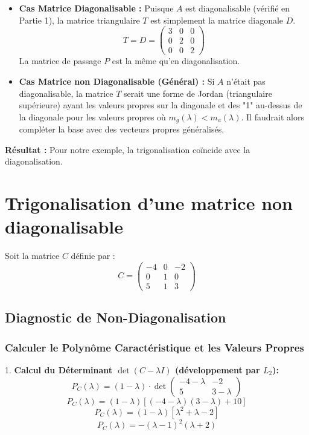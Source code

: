 \documentclass[french]{yLectureNote}
\begin{document}
\begin{itemize}
    \item \textbf{Cas Matrice Diagonalisable :}
    Puisque $A$ est diagonalisable (vérifié en Partie 1), la matrice triangulaire $T$ est simplement la matrice diagonale $D$.
    $$T = D = \begin{pmatrix} 3 & 0 & 0 \\ 0 & 2 & 0 \\ 0 & 0 & 2 \end{pmatrix}$$
    La matrice de passage $P$ est la même qu'en diagonalisation.

    \item \textbf{Cas Matrice non Diagonalisable (Général) :}
    Si $A$ n'était pas diagonalisable, la matrice $T$ serait une forme de Jordan (triangulaire supérieure) ayant les valeurs propres sur la diagonale et des "1" au-dessus de la diagonale pour les valeurs propres où $m_g(\lambda) < m_a(\lambda)$. Il faudrait alors compléter la base avec des vecteurs propres généralisés.
\end{itemize}

\textbf{Résultat :} Pour notre exemple, la trigonalisation coïncide avec la diagonalisation.
\section{Trigonalisation d'une matrice non diagonalisable}

Soit la matrice $C$ définie par :
$$C = \begin{pmatrix} -4 & 0 & -2 \\ 0 & 1 & 0 \\ 5 & 1 & 3 \end{pmatrix}$$


\subsection{Diagnostic de Non-Diagonalisation}

\subsubsection{Calculer le Polynôme Caractéristique et les Valeurs Propres}

1.  \textbf{Calcul du Déterminant $\det(C - \lambda I)$ (développement par $L_2$):}
    $$P_C(\lambda) = (1 - \lambda) \cdot \det\begin{pmatrix} -4 - \lambda & -2 \\ 5 & 3 - \lambda \end{pmatrix}$$
    $$P_C(\lambda) = (1 - \lambda) [(-4 - \lambda)(3 - \lambda) + 10]$$
    $$P_C(\lambda) = (1 - \lambda) [\lambda^2 + \lambda - 2]$$
    $$P_C(\lambda) = -(\lambda - 1)^2 (\lambda + 2)$$
\end{document}
